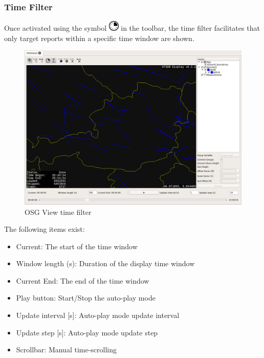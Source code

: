 {\subsubsection{Time Filter}

Once activated using the symbol \includegraphics[width=0.5cm]{../../data/icons/time.png} in the toolbar, the time filter facilitates that only target reports within a specific time window are shown.


\begin{figure}[H]
    \hspace*{-2cm}
    \includegraphics[width=18cm,frame]{../screenshots/osgview_time_filter.png}
  \caption{OSG View time filter}
  \label{fig:osgview_time_filter}
\end{figure}

The following items exist:

\begin{itemize}
 \item Current: The start of the time window
 \item Window length (s): Duration of the display time window
 \item Current End: The end of the time window
 \item Play button: Start/Stop the auto-play mode
 \item Update interval [s]: Auto-play mode update interval
 \item Update step [s]: Auto-play mode update step
 \item Scrollbar: Manual time-scrolling
\end{itemize}

}
